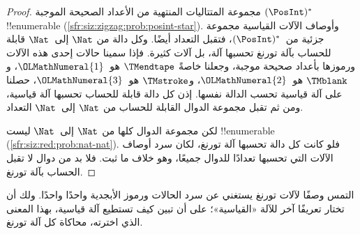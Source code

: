 \documentclass[../../../include/open-logic-section]{subfiles}
\begin{document}
\begin{proof}
مجموعة المتتاليات المنتهية من الأعداد الصحيحة الموجبة
$(\PosInt)^*$ !!{enumerable}
(\cref{sfr:siz:zigzag:prob:posint-star}). وأوصاف الآلات القياسية
مجموعة جزئية من~$(\PosInt)^*$، فتقبل التعداد أيضًا. وكل دالة من
$\Nat$ إلى~$\Nat$ قابلة للحساب بآلة تورنغ تحسبها آلة، بل آلات كثيرة.
فإذا سمينا حالات إحدى هذه الآلات ورموزها بأعداد صحيحة موجبة، وجعلنا
خاصةً $\TMendtape$ هو~${\OLMathNumeral{1}}$، و$\TMblank$ هو~${\OLMathNumeral{2}}$،
و$\TMstroke$ هو~${\OLMathNumeral{3}}$، حصلنا على آلة قياسية تحسب الدالة نفسها.
إذن كل دالة قابلة للحساب تحسبها آلة قياسية، ومن ثم تقبل مجموعة
الدوال القابلة للحساب من $\Nat$ إلى~$\Nat$ التعداد.

لكن مجموعة الدوال كلها من $\Nat$ إلى~$\Nat$ ليست !!{enumerable}
(\cref{sfr:siz:red:prob:nat-nat}). فلو كانت كل دالة تحسبها آلة
تورنغ، لكان سرد أوصاف الآلات التي تحسبها تعدادًا للدوال جميعًا، وهو
خلاف ما ثبت. فلا بد من دوال لا تقبل الحساب بآلة تورنغ.
\end{proof}

\begin{prob}
  التمس وصفًا لآلات تورنغ يستغني عن سرد الحالات ورموز الأبجدية واحدًا
  واحدًا. ولك أن تختار تعريفًا آخر للآلة «القياسية»؛ على أن تبين
  كيف تستطيع آلة قياسية، بهذا المعنى الذي اخترته، محاكاة كل آلة تورنغ.
\end{prob}
\end{document}
